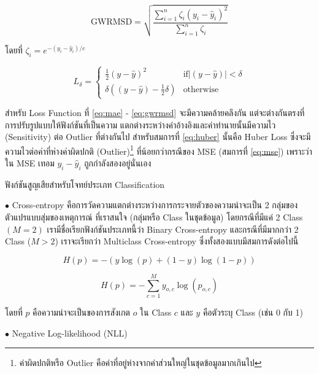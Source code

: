 \begin{equation}\label{eq:gwrmsd}
    \text{GWRMSD} = \sqrt{\frac{\sum_{i=1}^{n} \zeta_{i} (y_{i} - \hat{y}_{i})^{2}}{\sum_{i=1}^{n} \zeta_{i}}}
\end{equation}

\noindent โดยที่ $\zeta_{i} = e^{-(y_{i} - \hat{y}_{i}) / c}$

\begin{equation}\label{eq:huber}
    L_{\delta}=
    \left\{\begin{matrix}
        \frac{1}{2}(y - \hat{y})^{2} & \text{if} \left | (y - \hat{y})  \right | < \delta\\
        \delta ((y - \hat{y}) - \frac1 2 \delta) & \text{otherwise}
    \end{matrix}\right.
\end{equation}

สำหรับ Loss Function ที่ \ref{eq:mae} - \ref{eq:gwrmsd} จะมีความคล้ายคลึงกัน แต่จะต่างกันตรงที่การปรับรูปแบบให้ฟังก์ชันที่เป็นความ%
แตกต่างระหว่างค่าอ้างอิงและค่าทำนายนั้นมีความไว (Sensitivity) ต่อ Outlier ที่ต่างกันไป สำหรับสมการที่ \ref{eq:huber} นั้นคือ Huber
Loss ซึ่งจะมีความไวต่อค่าที่ห่างค่าผิดปกติ (Outlier)\footnote{ค่าผิดปกติหรือ Outlier คือค่าที่อยู่ห่างจากค่าส่วนใหญ่ในชุดข้อมูลมากเกินไป} 
ที่น้อยกว่ากรณีของ MSE (สมการที่ \ref{eq:mse}) เพราะว่าใน MSE เทอม $y_{i} - \hat{y}_{i}$ ถูกกำลังสองอยู่นั่นเอง

ฟังก์ชันสูญเสียสำหรับโจทย์ประเภท Classification

\noindent $\bullet$ Cross-entropy คือการวัดความแตกต่างระหว่างการกระจายตัวของความน่าจะเป็น 2 กลุ่มของตัวแปรแบบสุ่มของเหตุการณ์%
ที่เราสนใจ (กลุ่มหรือ Class ในชุดข้อมูล) โดยกรณีที่มีแค่ 2 Class $(M = 2)$ เรามีชื่อเรียกฟังก์ชันประเภทนี้ว่า Binary Cross-entropy 
และกรณีที่มีมากกว่า 2 Class ($M > 2$) เราจะเรียกว่า Multiclass Cross-entropy ซึ่งทั้งสองแบบมีสมการดังต่อไปนี้

\begin{equation}
    H(p) = -{(y\log(p) + (1 - y)\log(1 - p))}
\end{equation}

\begin{equation}
    H(p) = -\sum_{c=1}^My_{o,c}\log(p_{o,c})
\end{equation}


\noindent โดยที่ $p$ คือความน่าจะเป็นของการสังเกต $o$ ใน Class $c$ และ $y$ คือตัวระบุ Class (เช่น 0 กับ 1)

\noindent $\bullet$ Negative Log-likelihood (NLL)

